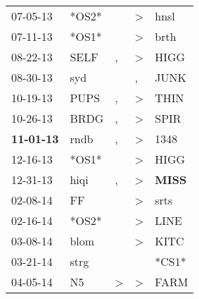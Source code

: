 \begin{supertabular}{p{0.07\textwidth}p{0.06\textwidth}p{0.02\textwidth}p{0.02\textwidth}p{0.06\textwidth}}
          07-05-13\textsuperscript{} &                            *OS2* &                  &     \textgreater &           hnsl\textsuperscript{} \\
          07-11-13\textsuperscript{} &                            *OS1* &                  &     \textgreater &           brth\textsuperscript{} \\
          08-22-13\textsuperscript{} &           SELF\textsuperscript{} &                , &     \textgreater &           HIGG\textsuperscript{} \\
          08-30-13\textsuperscript{} &            syd\textsuperscript{} &                  &                , &           JUNK\textsuperscript{} \\
          10-19-13\textsuperscript{} &           PUPS\textsuperscript{} &                , &     \textgreater &           THIN\textsuperscript{} \\
          10-26-13\textsuperscript{} &           BRDG\textsuperscript{} &                , &     \textgreater &           SPIR\textsuperscript{} \\
 \textbf{11-01-13\textsuperscript{}} &           rndb\textsuperscript{} &                , &     \textgreater &           1348\textsuperscript{} \\
          12-16-13\textsuperscript{} &                            *OS1* &                  &     \textgreater &           HIGG\textsuperscript{} \\
          12-31-13\textsuperscript{} &           hiqi\textsuperscript{} &                , &     \textgreater &  \textbf{MISS\textsuperscript{}} \\
          02-08-14\textsuperscript{} &             FF\textsuperscript{} &                  &     \textgreater &           srts\textsuperscript{} \\
          02-16-14\textsuperscript{} &                            *OS2* &                  &     \textgreater &           LINE\textsuperscript{} \\
          03-08-14\textsuperscript{} &           blom\textsuperscript{} &                  &     \textgreater &           KITC\textsuperscript{} \\
          03-21-14\textsuperscript{} &           strg\textsuperscript{} &                  &                  &                            *CS1* \\
          04-05-14\textsuperscript{} &             N5\textsuperscript{} &     \textgreater &     \textgreater &           FARM\textsuperscript{} \\

\end{supertabular}
